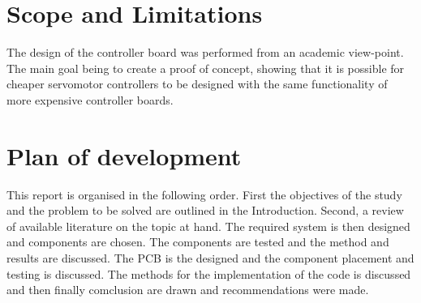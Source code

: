 \section{Scope and Limitations}
The design of the controller board was performed from an academic view-point. The main goal being to create a proof of concept, showing that it is possible for cheaper servomotor controllers to be designed with the same functionality of more expensive controller boards.

\vspace{5mm}
\section{Plan of development}
This report is organised in the following order. First the objectives of the study and the problem to be solved are outlined in the Introduction. Second, a review of available literature on the topic at hand. The required system is then designed and components are chosen. The components are tested and the method and results are discussed. The PCB is the designed and the component placement and testing is discussed. The methods for the implementation of the code is discussed and then finally comclusion are drawn and recommendations were made. 



